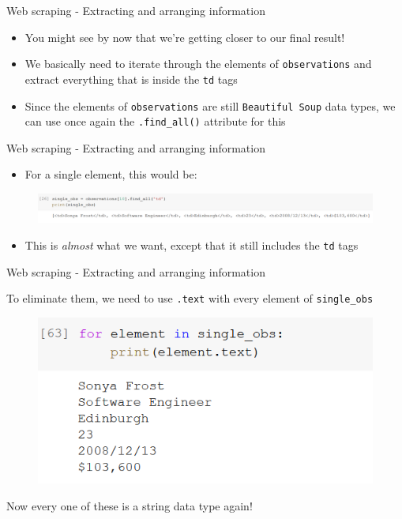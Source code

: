 \documentclass[aspectratio=169]{beamer}
\begin{document}
\begin{frame}{Web scraping - Extracting and arranging information}

	\begin{itemize}
		\item You might see by now that we're getting closer to our final result!
		\item We basically need to iterate through the elements of \texttt{observations} and extract everything that is inside the \texttt{td} tags
		\item Since the elements of \texttt{observations} are still \texttt{Beautiful Soup} data types, we can use once again the \texttt{.find\_all()} attribute for this 
	\end{itemize}

\end{frame}

\begin{frame}{Web scraping - Extracting and arranging information}

	\begin{itemize}
		\item For a single element, this would be:
	\end{itemize}

	\begin{figure}
		\centering
		\includegraphics[width=1.02\linewidth]{img/td_list.png}
	\end{figure}

	\begin{itemize}
		\item This is \textit{almost} what we want, except that it still includes the \texttt{td} tags
	\end{itemize}

\end{frame}

\begin{frame}{Web scraping - Extracting and arranging information}

	To eliminate them, we need to use \texttt{.text} with every element of \texttt{single\_obs}

	\begin{figure}
		\centering
		\includegraphics[width=0.5\linewidth]{img/td_list_text.png}
	\end{figure}

	Now every one of these is a string data type again!

\end{frame}
\end{document}
